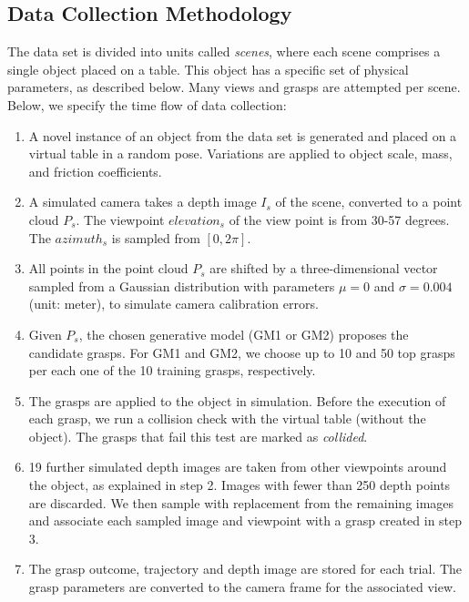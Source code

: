 \subsection{Data Collection Methodology}
\label{subsection:dataCollection}

The data set is divided into units called \textit{scenes}, where each scene comprises a single object placed on a table. This object has a specific set of physical parameters, as described below. Many views and grasps are attempted per scene. Below, we specify the time flow of data collection:

\begin{enumerate}
\item A novel instance of an object from the data set is generated and placed on a virtual table in a random pose. Variations are applied to object scale, mass, and friction coefficients.
\item A simulated camera takes a depth image $I_s$ of the scene, converted to a point cloud $P_s$. The viewpoint ${elevation}_s$ of the view point is from 30-57 degrees. The ${azimuth}_s$ is sampled from $[0, 2\pi]$. 
\item All points in the point cloud $P_s$ are shifted by a three-dimensional vector sampled from a Gaussian distribution with parameters $\mu=0$ and $\sigma = 0.004$ (unit: meter), to simulate camera calibration errors.
\item Given $P_s$, the chosen generative model (GM1 or GM2) proposes the candidate grasps. For GM1 and GM2, we choose up to 10 and 50 top grasps per each one of the 10 training grasps, respectively.
\item The grasps are applied to the object in simulation. Before the execution of each grasp, we run a collision check with the virtual table (without the object). The grasps that fail this test are marked as \textit{collided}.
\item 19 further simulated depth images are taken from other viewpoints around the object, as explained in step 2. Images with fewer than 250 depth points are discarded. We then sample with replacement from the remaining images and associate each sampled image and viewpoint with a grasp created in step 3.
\item The grasp outcome, trajectory and depth image are stored for each trial. The grasp parameters are converted to the camera frame for the associated view.
\end{enumerate}

